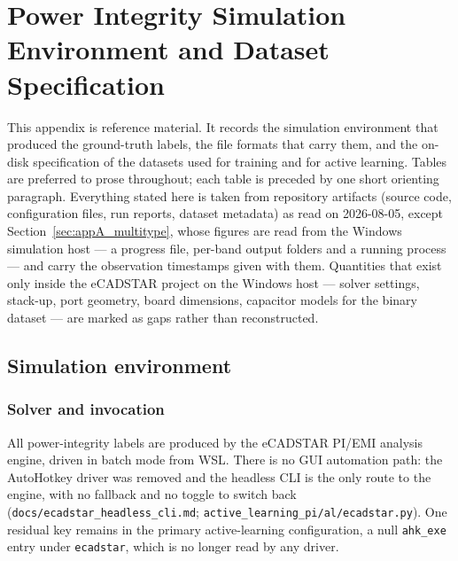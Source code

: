 
\chapter{Power Integrity Simulation Environment and Dataset Specification}
\label{ch:appendix_simulation_dataset}

This appendix is reference material. It records the simulation environment that produced the
ground-truth labels, the file formats that carry them, and the on-disk specification of the
datasets used for training and for active learning. Tables are preferred to prose throughout;
each table is preceded by one short orienting paragraph. Everything stated here is taken from
repository artifacts (source code, configuration files, run reports, dataset metadata) as read on
2026-08-05, except Section~\ref{sec:appA_multitype}, whose figures are read from the Windows
simulation host --- a progress file, per-band output folders and a running process --- and carry
the observation timestamps given with them. Quantities that exist only inside the eCADSTAR project
on the Windows host --- solver settings, stack-up, port geometry, board dimensions, capacitor
models for the binary dataset --- are marked as gaps rather than reconstructed.

\section{Simulation environment}
\label{sec:appA_sim_env}

\subsection{Solver and invocation}
\label{subsec:appA_solver}

All power-integrity labels are produced by the eCADSTAR PI/EMI analysis engine, driven in batch
mode from WSL. There is no GUI automation path: the AutoHotkey driver was removed and the headless
CLI is the only route to the engine, with no fallback and no toggle to switch back
(\texttt{docs/ecadstar\_headless\_cli.md}; \texttt{active\_\allowbreak{}learning\_\allowbreak{}pi/\allowbreak{}al/\allowbreak{}ecadstar.py}). One
residual key remains in the primary active-learning configuration, a null \texttt{ahk\_exe} entry
under \texttt{ecadstar}, which is no longer read by any driver.

